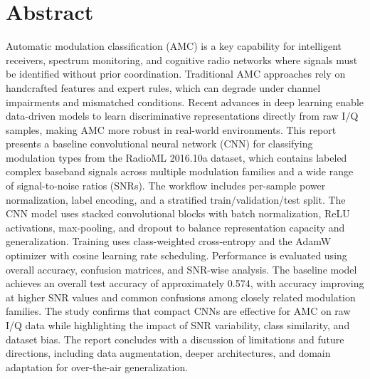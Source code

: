 \documentclass[12pt,a4paper]{report}
\begin{document}
\chapter*{Abstract}
Automatic modulation classification (AMC) is a key capability for intelligent receivers, spectrum monitoring, and cognitive radio networks where signals must be identified without prior coordination. Traditional AMC approaches rely on handcrafted features and expert rules, which can degrade under channel impairments and mismatched conditions. Recent advances in deep learning enable data-driven models to learn discriminative representations directly from raw I/Q samples, making AMC more robust in real-world environments. This report presents a baseline convolutional neural network (CNN) for classifying modulation types from the RadioML 2016.10a dataset, which contains labeled complex baseband signals across multiple modulation families and a wide range of signal-to-noise ratios (SNRs). The workflow includes per-sample power normalization, label encoding, and a stratified train/validation/test split. The CNN model uses stacked convolutional blocks with batch normalization, ReLU activations, max-pooling, and dropout to balance representation capacity and generalization. Training uses class-weighted cross-entropy and the AdamW optimizer with cosine learning rate scheduling. Performance is evaluated using overall accuracy, confusion matrices, and SNR-wise analysis. The baseline model achieves an overall test accuracy of approximately 0.574, with accuracy improving at higher SNR values and common confusions among closely related modulation families. The study confirms that compact CNNs are effective for AMC on raw I/Q data while highlighting the impact of SNR variability, class similarity, and dataset bias. The report concludes with a discussion of limitations and future directions, including data augmentation, deeper architectures, and domain adaptation for over-the-air generalization.

\end{document}
